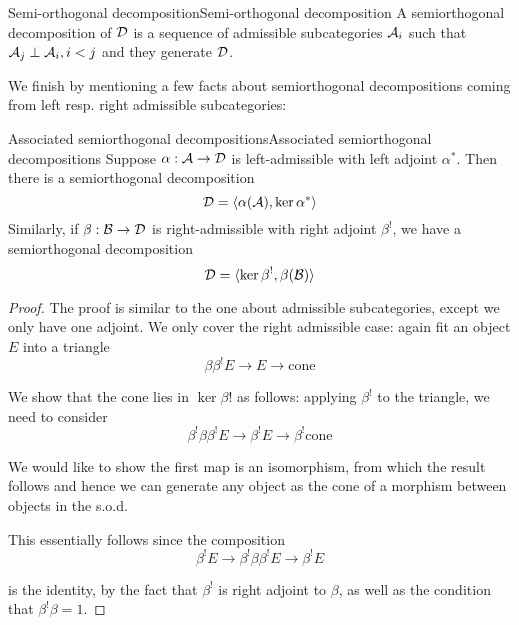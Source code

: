 
\begin{definition}{Semi-orthogonal decomposition}{Semi-orthogonal decomposition}
    A semiorthogonal decomposition of $\mathcal{D}$ is a sequence of admissible subcategories $\mathcal{A}_{i}$ such that $\mathcal{A}_{j}\perp \mathcal{A}_{i}, i<j$ and they generate $\mathcal{D}$.
\end{definition}

We finish by mentioning a few facts about semiorthogonal decompositions coming from left resp. right admissible subcategories:

\begin{proposition}{Associated semiorthogonal decompositions}{Associated semiorthogonal decompositions}
    Suppose $\alpha: \mathcal{A} \rightarrow \mathcal{D}$ is left-admissible with left adjoint $\alpha^*$. Then there is a semiorthogonal decomposition $$\mathcal{D} = \langle \alpha(\mathcal{A}), \ker \alpha^*\rangle $$
    Similarly, if $\beta:\mathcal{B}\rightarrow \mathcal{D}$ is right-admissible with right adjoint $\beta^!$, we have a semiorthogonal decomposition $$\mathcal{D}=\langle \ker \beta^!, \beta(\mathcal{B})\rangle$$
\end{proposition}

\begin{proof}
    The proof is similar to the one about admissible subcategories, except we only have one adjoint. We only cover the right admissible case: again fit an object $E$ into a triangle $$\beta \beta^! E \rightarrow E \rightarrow \mathrm{cone}$$

    We show that the cone lies in $\ker \beta!$ as follows: applying $\beta^!$ to the triangle, we need to consider $$\beta^! \beta \beta^!E \rightarrow \beta^! E\rightarrow \beta^! \mathrm{cone}$$

    We would like to show the first map is an isomorphism, from which the result follows and hence we can generate any object as the cone of a morphism between objects in the s.o.d.

    This essentially follows since the composition $$\beta^!E \rightarrow \beta^! \beta \beta^! E \rightarrow \beta^!E$$

    is the identity, by the fact that $\beta^!$ is right adjoint to $\beta$, as well as the condition that $\beta^!\beta=1$.
\end{proof}

